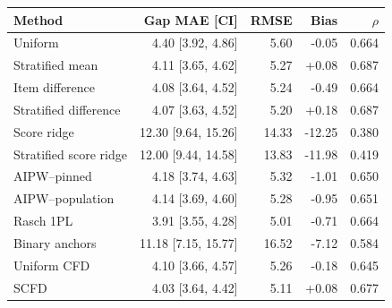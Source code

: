 \begin{tabular}{lrrrr}
\toprule
Method & Gap MAE [CI] & RMSE & Bias & $\rho$ \\
\midrule
Uniform & 4.40 [3.92, 4.86] & 5.60 & -0.05 & 0.664 \\
Stratified mean & 4.11 [3.65, 4.62] & 5.27 & +0.08 & 0.687 \\
Item difference & 4.08 [3.64, 4.52] & 5.24 & -0.49 & 0.664 \\
Stratified difference & 4.07 [3.63, 4.52] & 5.20 & +0.18 & 0.687 \\
Score ridge & 12.30 [9.64, 15.26] & 14.33 & -12.25 & 0.380 \\
Stratified score ridge & 12.00 [9.44, 14.58] & 13.83 & -11.98 & 0.419 \\
AIPW--pinned & 4.18 [3.74, 4.63] & 5.32 & -1.01 & 0.650 \\
AIPW--population & 4.14 [3.69, 4.60] & 5.28 & -0.95 & 0.651 \\
Rasch 1PL & 3.91 [3.55, 4.28] & 5.01 & -0.71 & 0.664 \\
Binary anchors & 11.18 [7.15, 15.77] & 16.52 & -7.12 & 0.584 \\
Uniform CFD & 4.10 [3.66, 4.57] & 5.26 & -0.18 & 0.645 \\
SCFD & 4.03 [3.64, 4.42] & 5.11 & +0.08 & 0.677 \\
\bottomrule
\end{tabular}
